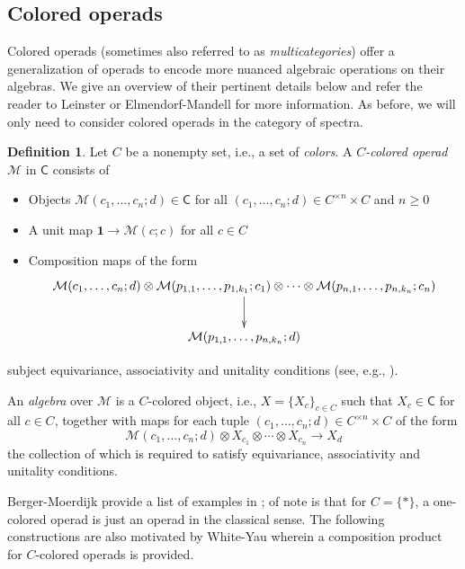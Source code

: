 \documentclass[11pt]{amsart}
\theoremstyle{definition}
\newtheorem{definition}[subsection]{Definition}
\theoremstyle{remark}
\newcommand{\pt}{*}
\newcommand{\Cal}[1]{\mathcal{#1}}
\begin{document}
\subsection{Colored operads}

Colored operads (sometimes also referred to as \textit{multicategories}) offer a generalization of operads to encode more nuanced algebraic operations on their algebras. We give an overview of their pertinent details below and refer the reader to Leinster \cite{Lei} or Elmendorf-Mandell \cite{EM-colop} for more information. As before, we will only need to consider colored operads in the category of spectra. 

\begin{definition} Let $C$ be a nonempty set, i.e., a set of \textit{colors}. A \textit{$C$-colored operad} $\Cal{M}$ in $\mathsf{C}$ consists of \begin{itemize}
    \item Objects $\mathcal{M}(c_1,\dots,c_n;d)\in \mathsf{C}$ for all $(c_1,\dots,c_n;d)\in C^{\times n}\times C$ and $n\geq 0$
    \item A unit map $\mathbf{1} \to \Cal{M}(c;c)$ for all $c\in C$
    \item Composition maps of the form \begin{equation} \label{eq:colored-op-comp}
    \xymatrix{
        \makebox[.8\textwidth]{$\Cal{M}(c_1,\dots,c_n;d)\otimes \Cal{M}(p_{1,1}, \dots, p_{1,k_1};c_1)\otimes \cdots \otimes \Cal{M}(p_{n,1},\dots,p_{n,k_n};c_n)$} \ar[d]\\%
    \Cal{M}(p_{1,1},\dots, p_{n,k_n};d)
    }
\end{equation}
\end{itemize} 
subject equivariance, associativity and unitality conditions (see, e.g.,  \cite[2.1]{EM-colop}).
\end{definition} 

An \textit{algebra} over $\mathcal{M}$ is a $C$-colored object, i.e., $X=\{X_c\}_{c\in C}$ such that $X_c\in \mathsf{C}$ for all $c\in C$, together with maps for each tuple $(c_1,\dots,c_n;d)\in C^{\times n}\times C$ of the form \[\Cal{M}(c_1,\dots,c_n;d)\otimes X_{c_1}\otimes \cdots \otimes X_{c_n} \to X_d\] the collection of which is required to satisfy equivariance, associativity and unitality conditions. 

Berger-Moerdijk provide a list of examples in \cite[]{BM-trees}; of note is that for $C=\{\pt\}$, a one-colored operad is just an operad in the classical sense. The following constructions are also motivated by White-Yau \cite{White-Yau} wherein a composition product for $C$-colored operads is provided.
\end{document}
